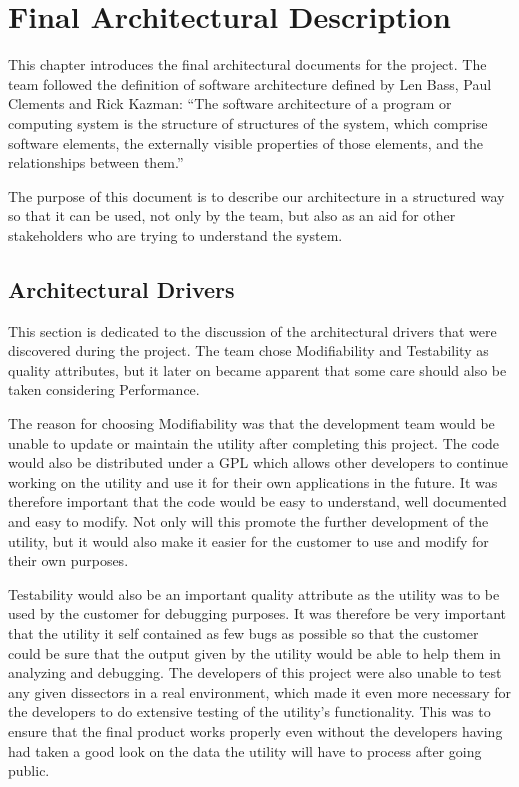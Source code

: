 \chapter{Final Architectural Description}
This chapter introduces the final architectural documents for the project. The team followed the definition of software architecture defined by Len Bass, Paul Clements and Rick Kazman: ``The software architecture of a program or computing
system is the structure of structures of the system, which comprise software elements, the externally visible properties of those elements, and the relationships between them.''~\cite[p.3]{Bass2003}

The purpose of this document is to describe our architecture in a structured way so that it can be used, not only by the team, but also as an aid for other stakeholders who are trying to understand the system.

\section{Architectural Drivers}
This section is dedicated to the discussion of the architectural drivers that were discovered during the project.
The team chose Modifiability and Testability as quality attributes, but it later on became apparent that some care should also be taken considering Performance.

The reason for choosing Modifiability was that the development team would be unable to update or maintain the \gls{utility} after completing this project. The code would also be distributed under a GPL which allows other developers to continue working on the utility and use it for their own applications in the future. It was therefore important that the code would be easy to understand, well documented and easy to modify. Not only will this promote the further development of the utility, but it would also make it easier for the customer to use and modify for their own purposes.

Testability would also be an important quality attribute as the \gls{utility} was to be used by the customer for debugging purposes. It was therefore be very important that the utility it self contained as few bugs as possible so that the customer could be sure that the output given by the utility would be able to help them in analyzing and debugging. The developers of this project were also unable to test any given \glspl{dissector} in a real environment, which made it even more necessary for the developers to do extensive testing of the utility's functionality. This was to ensure that the final product works properly even without the developers having had taken a good look on the data the utility will have to process after going public.

